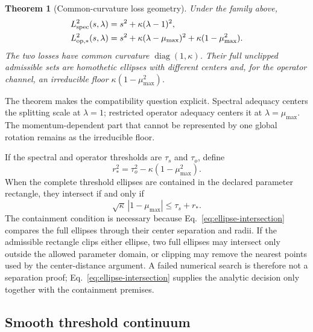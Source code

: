\documentclass[11pt]{article}
\newtheorem{theorem}{Theorem}
\theoremstyle{definition}
\begin{document}
\begin{theorem}[Common-curvature loss geometry]
Under the family above,
\begin{align}
 L_{\rm spec}^2(s,\lambda)
 &=s^2+\kappa(\lambda-1)^2,\label{eq:spec-quadratic}\\
 L_{\rm op,*}^2(s,\lambda)
 &=s^2+\kappa(\lambda-\mu_{\max})^2
 +\kappa(1-\mu_{\max}^2).
 \label{eq:op-quadratic}
\end{align}
The two losses have common curvature $\operatorname{diag}(1,\kappa)$.  Their full
unclipped admissible sets are homothetic ellipses with different centers and, for the
operator channel, an irreducible floor $\kappa(1-\mu_{\max}^2)$.
\end{theorem}

The theorem makes the compatibility question explicit.  Spectral adequacy centers the
splitting scale at $\lambda=1$; restricted operator adequacy centers it at
$\lambda=\mu_{\max}$.  The momentum-dependent part that cannot be represented by one
global rotation remains as the irreducible floor.

If the spectral and operator thresholds are $\tau_s$ and $\tau_o$, define
\begin{equation}
 r_*^2=\tau_o^2-\kappa(1-\mu_{\max}^2).
\end{equation}
When the complete threshold ellipses are contained in the declared parameter rectangle,
they intersect if and only if
\begin{equation}
 \sqrt\kappa\,|1-\mu_{\max}|\le \tau_s+r_*.
 \label{eq:ellipse-intersection}
\end{equation}
The containment condition is necessary because
Eq.~\eqref{eq:ellipse-intersection} compares the full ellipses through their center
separation and radii.  If the admissible rectangle clips either ellipse, two full
ellipses may intersect only outside the allowed parameter domain, or clipping may remove
the nearest points used by the center-distance argument.  A failed numerical search is
therefore not a separation proof; Eq.~\eqref{eq:ellipse-intersection} supplies the
analytic decision only together with the containment premises.

\subsection{Smooth threshold continuum}
\end{document}
